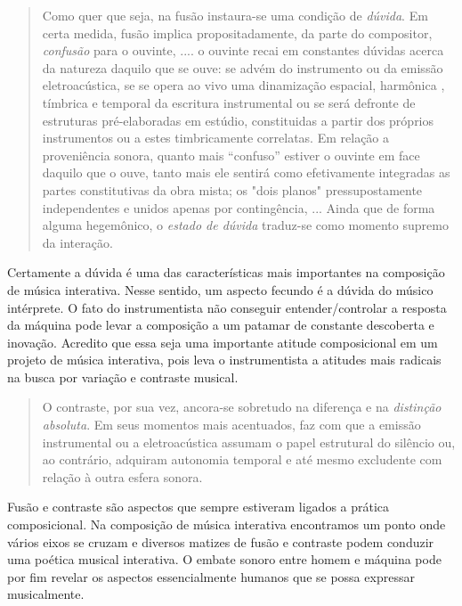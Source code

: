 \documentclass{ppgmus}
\begin{document}
\begin{quote}
Como quer que seja, na fusão instaura-se uma condição de \textit{dúvida}.
Em certa medida, fusão implica propositadamente, da parte do compositor,
\textit{confusão} para o ouvinte,
....
o ouvinte recai em constantes dúvidas
acerca da natureza daquilo que se ouve: se advém do instrumento ou da 
emissão eletroacústica, se se opera ao vivo uma dinamização espacial, harmônica
, tímbrica e temporal da escritura instrumental ou se será defronte de
estruturas pré-elaboradas em estúdio, constituidas a partir dos próprios
instrumentos ou a estes timbricamente correlatas. Em relação a proveniência
sonora, quanto mais ``confuso'' estiver o ouvinte em face daquilo que
o ouve, tanto mais ele sentirá como efetivamente integradas as partes
constitutivas da obra mista; os "dois planos" pressupostamente independentes
e unidos apenas por contingência,
... 
Ainda que de forma alguma hegemônico, o \textit{estado de
dúvida} traduz-se como momento supremo da interação. \cite{menezes2006musica}
\end{quote}

Certamente a dúvida é uma das características mais importantes na composição
de música interativa. Nesse sentido, um aspecto fecundo é a dúvida do músico
intérprete. O fato do instrumentista não conseguir entender/controlar a resposta
da máquina pode levar a composição a um patamar de constante descoberta e inovação.
Acredito que essa seja uma importante atitude composicional em um projeto de 
música interativa, pois leva o instrumentista a atitudes mais radicais na 
busca por variação e contraste musical.

\begin{quote}
O contraste, por sua vez, ancora-se sobretudo na diferença e na 
\textit{distinção absoluta}. Em seus momentos mais acentuados, faz com
que a emissão instrumental ou a eletroacústica assumam o papel estrutural
do silêncio ou, ao contrário, adquiram autonomia temporal e até mesmo
excludente com relação à outra esfera sonora. \cite{menezes2006musica}
\end{quote}

Fusão e contraste são aspectos que sempre estiveram ligados a prática
composicional. Na composição de música interativa encontramos um ponto onde
vários eixos se cruzam e diversos matizes de fusão e contraste podem
conduzir uma poética musical interativa.
O embate sonoro entre homem e máquina pode por fim revelar os aspectos
essencialmente humanos que se possa expressar musicalmente. 
\end{document}

